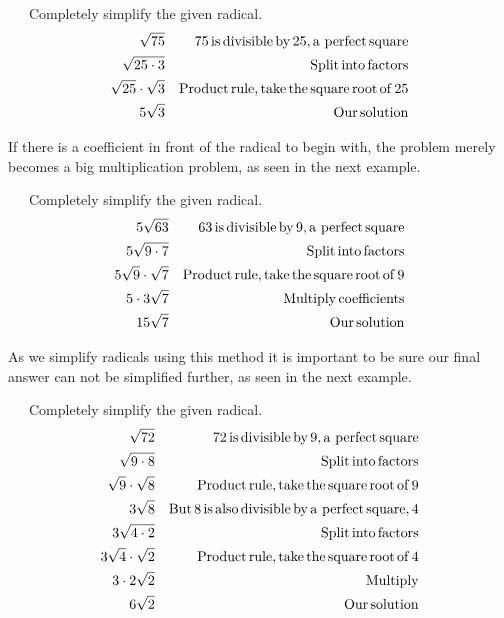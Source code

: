 \begin{example}~~~Completely simplify the given radical.
  \begin{eqnarray*}
    \sqrt{75} &  & 75 \operatorname{is} \operatorname{divisible} \operatorname{by} 25, 
    \operatorname{a~perfect} \operatorname{square}\\
    \sqrt{25 \cdot 3} &  & \operatorname{Split} \operatorname{into} \operatorname{factors}\\
    \sqrt{25} \cdot \sqrt{3} &  & \operatorname{Product} \operatorname{rule}, \operatorname{take}
    \operatorname{the} \operatorname{square} \operatorname{root} \operatorname{of} 25\\
    5 \sqrt{3} &  & \operatorname{Our} \operatorname{solution}
  \end{eqnarray*}
\end{example}
  
If there is a coefficient in front of the radical to begin with, the problem
merely becomes a big multiplication problem, as seen in the next example.

\begin{example}~~~Completely simplify the given radical.
  \begin{eqnarray*}
    5 \sqrt{63} &  & 63 \operatorname{is} \operatorname{divisible} \operatorname{by} 9, 
    \operatorname{a~perfect} \operatorname{square}\\
    5 \sqrt{9 \cdot 7} &  & \operatorname{Split} \operatorname{into} \operatorname{factors}\\
    5 \sqrt{9} \cdot \sqrt{7} &  & \operatorname{Product} \operatorname{rule}, \operatorname{take}
    \operatorname{the} \operatorname{square} \operatorname{root} \operatorname{of} 9\\
    5 \cdot 3 \sqrt{7} &  & \operatorname{Multiply} \operatorname{coefficients}\\
    15 \sqrt{7} &  & \operatorname{Our} \operatorname{solution}
  \end{eqnarray*}
\end{example}
  
As we simplify radicals using this method it is important to be sure our final
answer can not be simplified further, as seen in the next example.

\begin{example}~~~Completely simplify the given radical.
  \begin{eqnarray*}
    \sqrt{72} &  & 72 \operatorname{is} \operatorname{divisible} \operatorname{by} 9, \operatorname{a~perfect}
    \operatorname{square}\\
    \sqrt{9 \cdot 8} &  & \operatorname{Split} \operatorname{into} \operatorname{factors}\\
    \sqrt{9} \cdot \sqrt{8} &  & \operatorname{Product} \operatorname{rule}, \operatorname{take}
    \operatorname{the} \operatorname{square} \operatorname{root} \operatorname{of} 9\\
    3 \sqrt{8} &  & \operatorname{But} 8 \operatorname{is} \operatorname{also} \operatorname{divisible}
    \operatorname{by} \operatorname{a~perfect} \operatorname{square}, 4\\
    3 \sqrt{4 \cdot 2} &  & \operatorname{Split} \operatorname{into} \operatorname{factors}\\
    3 \sqrt{4} \cdot \sqrt{2} &  & \operatorname{Product} \operatorname{rule}, \operatorname{take}
    \operatorname{the} \operatorname{square} \operatorname{root} \operatorname{of} 4\\
    3 \cdot 2 \sqrt{2} &  & \operatorname{Multiply}\\
    6 \sqrt{2} &  & \operatorname{Our} \operatorname{solution}
  \end{eqnarray*}
\end{example}

